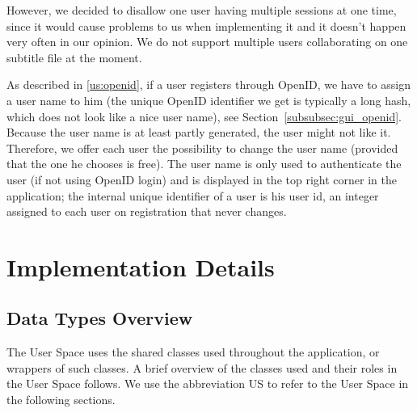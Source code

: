 However, we decided to disallow one user having multiple sessions at one time, since it would cause problems to us when implementing it and it doesn't happen very often in our opinion. We do not support multiple users collaborating on one subtitle file at the moment.

As described in \ref{us:openid}, if a user registers through OpenID, we have to assign a user name to him (the unique OpenID identifier we get is typically a long hash, which does not look like a nice user name), see Section~\ref{subsubsec:gui_openid}. Because the user name is at least partly generated, the user might not like it. Therefore, we offer each user the possibility to change the user name (provided that the one he chooses is free). The user name is only used to authenticate the user (if not using OpenID login) and is displayed in the top right corner in the application; the internal unique identifier of a user is his user id, an integer assigned to each user on registration that never changes.

\section{Implementation Details}
\subsection{Data Types Overview}

The User Space uses the shared classes used throughout the application, or wrappers of such classes. A brief overview of the classes used and their roles in the User Space follows. We use the abbreviation US to refer to the User Space in the following sections.

